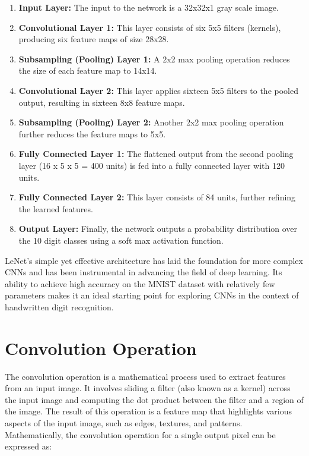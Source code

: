 \begin{enumerate}
  \item \textbf{Input Layer:} The input to the network is a 32x32x1 gray scale image.
  \item \textbf{Convolutional Layer 1:} This layer consists of six 5x5 filters (kernels), producing six feature maps of size 28x28.
  \item \textbf{Subsampling (Pooling) Layer 1:} A 2x2 max pooling operation reduces the size of each feature map to 14x14.
  \item \textbf{Convolutional Layer 2:} This layer applies sixteen 5x5 filters to the pooled output, resulting in sixteen 8x8 feature maps.
  \item \textbf{Subsampling (Pooling) Layer 2:} Another 2x2 max pooling operation further reduces the feature maps to 5x5.
  \item \textbf{Fully Connected Layer 1:} The flattened output from the second pooling layer (16 x 5 x 5 = 400 units) is fed into a fully connected layer with 120 units.
  \item \textbf{Fully Connected Layer 2:} This layer consists of 84 units, further refining the learned features.
  \item \textbf{Output Layer:} Finally, the network outputs a probability distribution over the 10 digit classes using a soft max activation function.
\end{enumerate}
LeNet's simple yet effective architecture has laid the foundation for more complex CNNs and has been instrumental in advancing the field of deep learning. Its ability to achieve high accuracy on the MNIST dataset with relatively few parameters makes it an ideal starting point for exploring CNNs in the context of handwritten digit recognition.


\section{Convolution Operation}
The convolution operation is a mathematical process used to extract features from an input image. It involves sliding a filter (also known as a kernel) across the input image and computing the dot product between the filter and a region of the image. The result of this operation is a feature map that highlights various aspects of the input image, such as edges, textures, and patterns.
\\
Mathematically, the convolution operation for a single output pixel can be expressed as:

